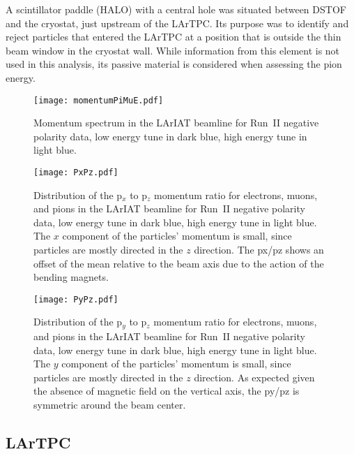 \documentclass[%
 floatfix,
 reprint,
 twocolumn,
superscriptaddress,
showpacs,preprintnumbers,
 amsmath,amssymb,
 aps,
prd,
]{revtex4-1}
\begin{document}
A scintillator paddle (HALO) with a central hole was situated between DSTOF and the cryostat, just upstream of the LArTPC. Its purpose was to identify and reject particles that entered the LArTPC at a position that is outside the thin beam window in the cryostat wall. While information from this element is not used in this analysis, its passive material is considered when assessing the pion energy.


\begin{figure}
\centering  
\texttt{[image: momentumPiMuE.pdf]}
\caption{Momentum spectrum in the LArIAT beamline  for Run~II negative polarity data, low energy tune in dark blue, high energy tune in light blue. }
\label{fig:momentum}
\end{figure}

\begin{figure}
\centering  
\texttt{[image: PxPz.pdf]}
\caption{Distribution of the p$_x$ to p$_z$ momentum ratio for electrons, muons, and pions in the LArIAT beamline  for Run~II negative polarity data, low energy tune in dark blue, high energy tune in light blue.  The $x$ component of the particles' momentum is small, since particles are mostly directed in the $z$ direction. The px/pz shows an offset of the mean relative to the beam axis due to the action of the bending magnets.}
\label{fig:momentumpx}
\end{figure}

\begin{figure}
\centering  
\texttt{[image: PyPz.pdf]}
\caption{Distribution of the p$_y$ to p$_z$ momentum ratio for electrons, muons, and pions in the LArIAT beamline  for Run~II negative polarity data, low energy tune in dark blue, high energy tune in light blue. The $y$ component of the particles' momentum is small, since particles are mostly directed in the $z$ direction. As expected given the absence of magnetic field on the vertical axis, the py/pz is symmetric around the beam center. }
\label{fig:momentumpy}
\end{figure}




\subsection{\label{sec:LArTPC}LArTPC}
\end{document}
